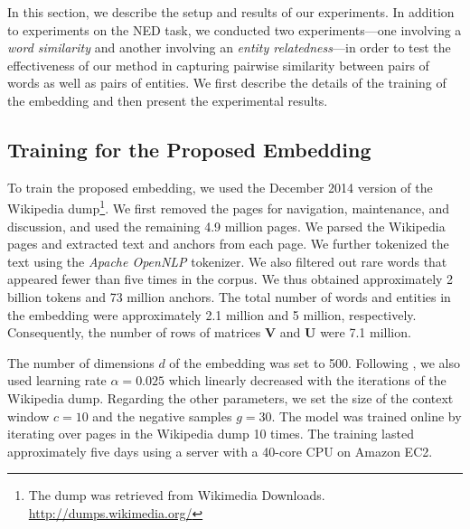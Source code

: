 \documentclass[11pt,letterpaper]{article}
\begin{document}
In this section, we describe the setup and results of our experiments.
In addition to experiments on the NED task, we conducted two experiments---one involving a \textit{word similarity} and another involving an \textit{entity relatedness}---in order to test the effectiveness of our method in capturing pairwise similarity between pairs of words as well as pairs of entities.
We first describe the details of the training of the embedding and then present the experimental results.

\subsection{Training for the Proposed Embedding}

To train the proposed embedding, we used the December 2014 version of the Wikipedia dump\footnote{The dump was retrieved from Wikimedia Downloads. \url{http://dumps.wikimedia.org/}}.
We first removed the pages for navigation, maintenance, and discussion, and used the remaining 4.9 million pages.
We parsed the Wikipedia pages and extracted text and anchors from each page.
We further tokenized the text using the \textit{Apache OpenNLP} tokenizer.
We also filtered out rare words that appeared fewer than five times in the corpus.
We thus obtained approximately 2 billion tokens and 73 million anchors.
The total number of words and entities in the embedding were approximately 2.1 million and 5 million, respectively.
Consequently, the number of rows of matrices $\mathbf{V}$ and $\mathbf{U}$ were 7.1 million.

The number of dimensions $d$ of the embedding was set to 500.
Following \cite{Mikolov2013a}, we also used learning rate $\alpha = 0.025$ which linearly decreased with the iterations of the Wikipedia dump.
Regarding the other parameters, we set the size of the context window $c = 10$ and the negative samples $g = 30$.
The model was trained online by iterating over pages in the Wikipedia dump 10 times.
The training lasted approximately five days using a server with a 40-core CPU on Amazon EC2.
\end{document}
